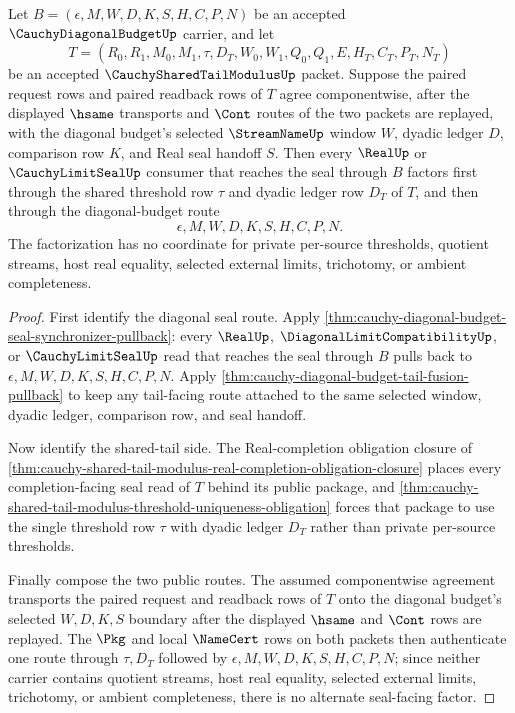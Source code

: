 \begin{theorem}
\label{thm:cauchy-diagonal-budget-shared-tail-modulus-seal-factorization}
Let $B=(\epsilon,M,W,D,K,S,H,C,P,N)$ be an accepted $\CauchyDiagonalBudgetUp$ carrier, and let
$$
T=(R_0,R_1,M_0,M_1,\tau,D_T,W_0,W_1,Q_0,Q_1,E,H_T,C_T,P_T,N_T)
$$
be an accepted $\CauchySharedTailModulusUp$ packet. Suppose the paired request rows and paired readback rows of $T$ agree componentwise, after the displayed $\hsame$ transports and $\Cont$ routes of the two packets are replayed, with the diagonal budget's selected $\StreamNameUp$ window $W$, dyadic ledger $D$, comparison row $K$, and Real seal handoff $S$. Then every $\RealUp$ or $\CauchyLimitSealUp$ consumer that reaches the seal through $B$ factors first through the shared threshold row $\tau$ and dyadic ledger row $D_T$ of $T$, and then through the diagonal-budget route
$$
\epsilon,M,W,D,K,S,H,C,P,N.
$$
The factorization has no coordinate for private per-source thresholds, quotient streams, host real equality, selected external limits, trichotomy, or ambient completeness.
\end{theorem}
\begin{proof}
First identify the diagonal seal route. Apply \autoref{thm:cauchy-diagonal-budget-seal-synchronizer-pullback}: every $\RealUp$, $\DiagonalLimitCompatibilityUp$, or $\CauchyLimitSealUp$ read that reaches the seal through $B$ pulls back to $\epsilon,M,W,D,K,S,H,C,P,N$. Apply \autoref{thm:cauchy-diagonal-budget-tail-fusion-pullback} to keep any tail-facing route attached to the same selected window, dyadic ledger, comparison row, and seal handoff.

Now identify the shared-tail side. The Real-completion obligation closure of \autoref{thm:cauchy-shared-tail-modulus-real-completion-obligation-closure} places every completion-facing seal read of $T$ behind its public package, and \autoref{thm:cauchy-shared-tail-modulus-threshold-uniqueness-obligation} forces that package to use the single threshold row $\tau$ with dyadic ledger $D_T$ rather than private per-source thresholds.

Finally compose the two public routes. The assumed componentwise agreement transports the paired request and readback rows of $T$ onto the diagonal budget's selected $W,D,K,S$ boundary after the displayed $\hsame$ and $\Cont$ rows are replayed. The $\Pkg$ and local $\NameCert$ rows on both packets then authenticate one route through $\tau,D_T$ followed by $\epsilon,M,W,D,K,S,H,C,P,N$; since neither carrier contains quotient streams, host real equality, selected external limits, trichotomy, or ambient completeness, there is no alternate seal-facing factor.
\end{proof}

